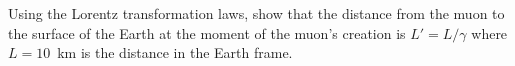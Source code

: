 \begin{exercise}
Using the Lorentz transformation laws, show that the distance from the muon to the surface of the Earth at the moment of the muon's creation is $L'=L/\gamma$ where $L=10$~km is the distance in the Earth frame. 
\end{exercise}




